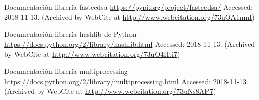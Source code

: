 \documentclass[final, 12pt,oneside]{class_diss}
\begin{document}
\begin{thebibliography}{10}
 Documentación librería fastecdsa \url{https://pypi.org/project/fastecdsa/} Accessed: 2018-11-13. (Archived by WebCite at \url{http://www.webcitation.org/73uOA1nmI})

 Documentación librería hashlib de Python \url{https://docs.python.org/2/library/hashlib.html} Accessed: 2018-11-13. (Archived by WebCite at \url{http://www.webcitation.org/73uO4Hti7})

 Documentación librería multiprocessing \url{https://docs.python.org/2/library/multiprocessing.html} Accessed: 2018-11-13. (Archived by WebCite at \url{http://www.webcitation.org/73uNs8AP7})

\end{thebibliography}







%
\end{document}
